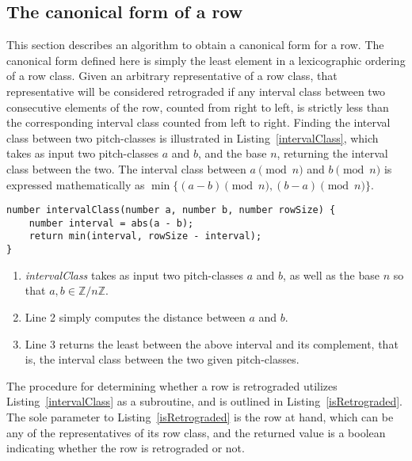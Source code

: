 \subsection{The canonical form of a row}

This section describes an algorithm to obtain a canonical form for a row. The canonical form defined here is simply the least element in a lexicographic ordering of a row class. Given an arbitrary representative of a row class, that representative will be considered retrograded if any interval class between two consecutive elements of the row, counted from right to left, is strictly less than the corresponding interval class counted from left to right. Finding the interval class between two pitch-classes is illustrated in Listing~\ref{intervalClass}, which takes as input two pitch-classes $a$ and $b$, and the base $n$, returning the interval class between the two. The interval class between $a \pmod n$ and $b \pmod n$ is expressed mathematically as $\min\{(a - b) \pmod n, (b - a) \pmod n\}$.

\begin{lstlisting}[caption={Computing the interval class between two pitch-classes.},label={intervalClass}]
number intervalClass(number a, number b, number rowSize) {
    number interval = abs(a - b);
    return min(interval, rowSize - interval);
}
\end{lstlisting}

\begin{enumerate}
\item \emph{intervalClass} takes as input two pitch-classes $a$ and $b$, as well as the base $n$ so that $a, b \in \mathbb{Z} / n \mathbb{Z}$.
\item Line 2 simply computes the distance between $a$ and $b$.
\item Line 3 returns the least between the above interval and its complement, that is, the interval class between the two given pitch-classes.
\end{enumerate}

The procedure for determining whether a row is retrograded utilizes Listing~\ref{intervalClass} as a subroutine, and is outlined in Listing~\ref{isRetrograded}. The sole parameter to Listing~\ref{isRetrograded} is the row at hand, which can be any of the representatives of its row class, and the returned value is a boolean indicating whether the row is retrograded or not.

